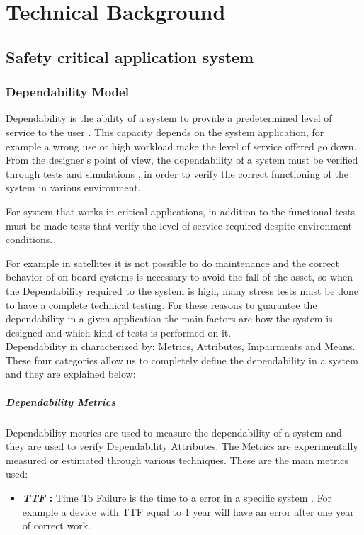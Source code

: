 \chapter{Technical Background}{
	\section{Safety critical application system}{
		\subsection{Dependability Model}{
			Dependability is the ability of a system to provide a predetermined level of service to the user . This capacity depends on the system application, for example a wrong use or high workload make the level of service offered go down. 
			From the designer's point of view, the dependability of a system must be verified through tests and simulations , in order to verify the correct functioning of the system in various environment.
			
			For system that works in critical applications, in addition to the functional tests must be made tests that verify the level of service required despite environment conditions. 
			
			For example in satellites it is not possible to do maintenance and the correct behavior of on-board systems is necessary to avoid the fall of the asset, so when the Dependability required to the system is high, many stress tests must be done to have a complete technical testing. For these reasons to guarantee the dependability in a given application the main factors are how the system is designed and which kind of tests is performed on it.\\
			
			Dependability in characterized by: Metrics, Attributes, Impairments and Means. These four categories allow us to completely define the dependability in a system and they are explained below:
			\paragraph{Dependability Metrics}{
				Dependability metrics are used to measure the dependability of a system and they are used to verify Dependability Attributes. The Metrics are experimentally measured or estimated through various techniques. These are the main metrics used: 
				\begin{itemize}
					\item \textbf{\textit{TTF} : } Time To Failure is the time to a error in a specific system . For example a device with TTF equal to 1 year will have an error after one year of correct work.
		

\end{itemize}}}}}
